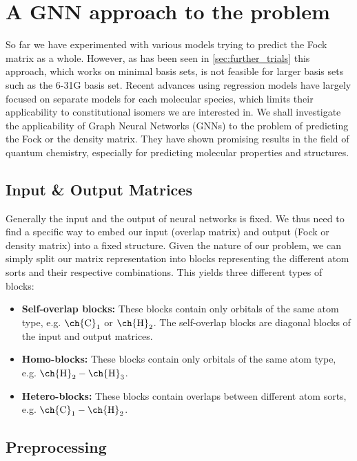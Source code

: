 \chapter{A GNN approach to the problem}
\label{chap:gnn}
So far we have experimented with various models trying to predict the Fock matrix as a whole. However, as has been seen in \autoref{sec:further_trials} this approach, which works on minimal basis sets, is not feasible for larger basis sets such as the 6-31G basis set. Recent advances using regression models have largely focused on separate models for each molecular species, which limits their applicability to constitutional isomers we are interested in. \parencite{Hazra2024,Shao2023}
We shall investigate the applicability of Graph Neural Networks (GNNs) to the problem of predicting the Fock or the density matrix. They have shown promising results in the field of quantum chemistry, especially for predicting molecular properties and structures. \parencite{schnet2018}  \\
\section{Input \& Output Matrices}
\label{sec:gnn_input_output_matrices}
Generally the input and the output of neural networks is fixed. We thus need to find a specific way to embed our input (overlap matrix) and output (Fock or density matrix) into a fixed structure. Given the nature of our problem, we can simply split our matrix representation into blocks representing the different atom sorts and their respective combinations. This yields three different types of blocks: 
\begin{itemize}
    \item \textbf{Self-overlap blocks:} These blocks contain only orbitals of the same atom type, e.g. $\text{\ch{C}}_1$ or $\text{\ch{H}}_2$. The self-overlap blocks are diagonal blocks of the input and output matrices.
    \item \textbf{Homo-blocks:} These blocks contain only orbitals of the same atom type, e.g. $\text{\ch{H}}_2 - \text{\ch{H}}_3$.
    \item \textbf{Hetero-blocks:} These blocks contain overlaps between different atom sorts, e.g. $\text{\ch{C}}_1 - \text{\ch{H}}_2$.
\end{itemize}
\section{Preprocessing}
\label{sec:gnn_preproc}
